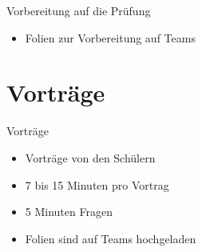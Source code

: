 \begin{frame}{Vorbereitung auf die Prüfung}
\begin{itemize}
    \item Folien zur Vorbereitung auf Teams
\end{itemize}
\end{frame}









\section{Vorträge}
\BlueSectionSlide

\begin{frame}{Vorträge}
    \begin{itemize}
        \item[\textbullet] Vorträge von den Schülern
        \item[\textbullet] 7 bis 15 Minuten pro Vortrag
        \item[\textbullet] 5 Minuten Fragen
        \item[\textbullet] Folien sind auf Teams hochgeladen
    \end{itemize}
\end{frame}

